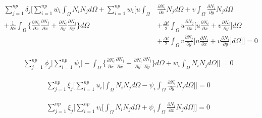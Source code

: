 \begin{equation}
 \begin{aligned} 
  \sum\limits_{j=1}^{np} \delta_j \Bigg[
  \sum\limits_{i=1}^{np} \overset{.}{w_i} \int_{\Omega} N_i N_j d\Omega 
   + \sum\limits_{i=1}^{np} w_i \Bigg[
    u \int_{\Omega} & \frac{\partial N_i}{\partial x} N_j d\Omega 
  + v \int_{\Omega} \frac{\partial N_i}{\partial y} N_j d\Omega
  \\[5pt]
  + \frac{1}{\textit{Re}} \int_{\Omega} \Bigg\{ 
                    \frac{\partial N_i}{\partial x} 
                    \frac{\partial N_j}{\partial x} 
   +                 \frac{\partial N_i}{\partial y} 
                    \frac{\partial N_j}{\partial y} 
  \Bigg\} d\Omega
 & + \frac{\Delta t}{2} \int_{\Omega} u \frac{\partial N_j}{\partial x}
 \Bigg[
   u \frac{\partial N_i}{\partial x}
 + v \frac{\partial N_i}{\partial y}
 \Bigg] d\Omega
 \\[5pt]
 & + \frac{\Delta t}{2} \int_{\Omega} v \frac{\partial N_j}{\partial y}
 \Bigg[
   u \frac{\partial N_i}{\partial x}
 + v \frac{\partial N_i}{\partial y}
 \Bigg] d\Omega
 \Bigg] \Bigg] = 0
 \end{aligned}
\end{equation}

\begin{equation}
 \begin{aligned}
  \sum\limits_{j=1}^{np} \phi_j \Bigg[
  \sum\limits_{i=1}^{np} \psi_i \Bigg[
  - \int_{\Omega} \Bigg\{ 
                  \frac{\partial N_i}{\partial x} 
                  \frac{\partial N_j}{\partial x} 
  +               \frac{\partial N_i}{\partial y} 
                  \frac{\partial N_j}{\partial y} 
  \Bigg\} d\Omega
  + w_i \int_{\Omega} N_i N_j d\Omega
  \Bigg] \Bigg] = 0
 \end{aligned}
\end{equation}

\begin{equation}
 \begin{aligned}
  \sum\limits_{j=1}^{np} \xi_j \Bigg[
  \sum\limits_{i=1}^{np} u_i \Bigg[
   \int_{\Omega} N_i N_j d\Omega
 - \psi_i \int_{\Omega} \frac{\partial N_i}{\partial y} N_j d\Omega
  \Bigg] \Bigg] = 0
 \end{aligned}
\end{equation}

\begin{equation}
 \begin{aligned}
  \sum\limits_{j=1}^{np} \xi_j \Bigg[
  \sum\limits_{i=1}^{np} v_i \Bigg[
   \int_{\Omega} N_i N_j d\Omega
 + \psi_i \int_{\Omega} \frac{\partial N_i}{\partial x} N_j d\Omega
  \Bigg] \Bigg] = 0
 \end{aligned}
\end{equation}

